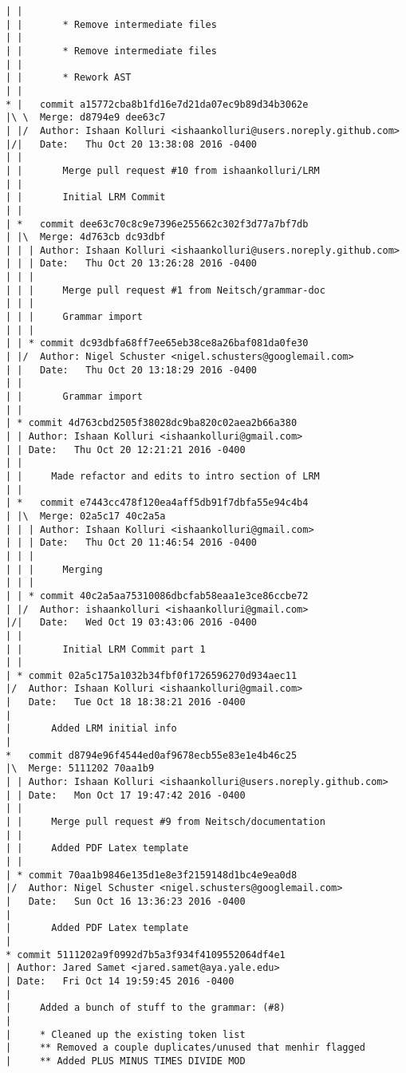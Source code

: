 \begin{lstlisting}
| |       
| |       * Remove intermediate files
| |       
| |       * Remove intermediate files
| |       
| |       * Rework AST
| |     
* |   commit a15772cba8b1fd16e7d21da07ec9b89d34b3062e
|\ \  Merge: d8794e9 dee63c7
| |/  Author: Ishaan Kolluri <ishaankolluri@users.noreply.github.com>
|/|   Date:   Thu Oct 20 13:38:08 2016 -0400
| |   
| |       Merge pull request #10 from ishaankolluri/LRM
| |       
| |       Initial LRM Commit
| |     
| *   commit dee63c70c8c9e7396e255662c302f3d77a7bf7db
| |\  Merge: 4d763cb dc93dbf
| | | Author: Ishaan Kolluri <ishaankolluri@users.noreply.github.com>
| | | Date:   Thu Oct 20 13:26:28 2016 -0400
| | | 
| | |     Merge pull request #1 from Neitsch/grammar-doc
| | |     
| | |     Grammar import
| | |    
| | * commit dc93dbfa68ff7ee65eb38ce8a26baf081da0fe30
| |/  Author: Nigel Schuster <nigel.schusters@googlemail.com>
| |   Date:   Thu Oct 20 13:18:29 2016 -0400
| |   
| |       Grammar import
| |   
| * commit 4d763cbd2505f38028dc9ba820c02aea2b66a380
| | Author: Ishaan Kolluri <ishaankolluri@gmail.com>
| | Date:   Thu Oct 20 12:21:21 2016 -0400
| | 
| |     Made refactor and edits to intro section of LRM
| |     
| *   commit e7443cc478f120ea4aff5db91f7dbfa55e94c4b4
| |\  Merge: 02a5c17 40c2a5a
| | | Author: Ishaan Kolluri <ishaankolluri@gmail.com>
| | | Date:   Thu Oct 20 11:46:54 2016 -0400
| | | 
| | |     Merging
| | |    
| | * commit 40c2a5aa75310086dbcfab58eaa1e3ce86ccbe72
| |/  Author: ishaankolluri <ishaankolluri@gmail.com>
|/|   Date:   Wed Oct 19 03:43:06 2016 -0400
| |   
| |       Initial LRM Commit part 1
| |   
| * commit 02a5c175a1032b34fbf0f1726596270d934aec11
|/  Author: Ishaan Kolluri <ishaankolluri@gmail.com>
|   Date:   Tue Oct 18 18:38:21 2016 -0400
|   
|       Added LRM initial info
|    
*   commit d8794e96f4544ed0af9678ecb55e83e1e4b46c25
|\  Merge: 5111202 70aa1b9
| | Author: Ishaan Kolluri <ishaankolluri@users.noreply.github.com>
| | Date:   Mon Oct 17 19:47:42 2016 -0400
| | 
| |     Merge pull request #9 from Neitsch/documentation
| |     
| |     Added PDF Latex template
| |   
| * commit 70aa1b9846e135d1e8e3f2159148d1bc4e9ea0d8
|/  Author: Nigel Schuster <nigel.schusters@googlemail.com>
|   Date:   Sun Oct 16 13:36:23 2016 -0400
|   
|       Added PDF Latex template
|  
* commit 5111202a9f0992d7b5a3f934f4109552064df4e1
| Author: Jared Samet <jared.samet@aya.yale.edu>
| Date:   Fri Oct 14 19:59:45 2016 -0400
| 
|     Added a bunch of stuff to the grammar: (#8)
|     
|     * Cleaned up the existing token list
|     ** Removed a couple duplicates/unused that menhir flagged
|     ** Added PLUS MINUS TIMES DIVIDE MOD

\end{lstlisting}
